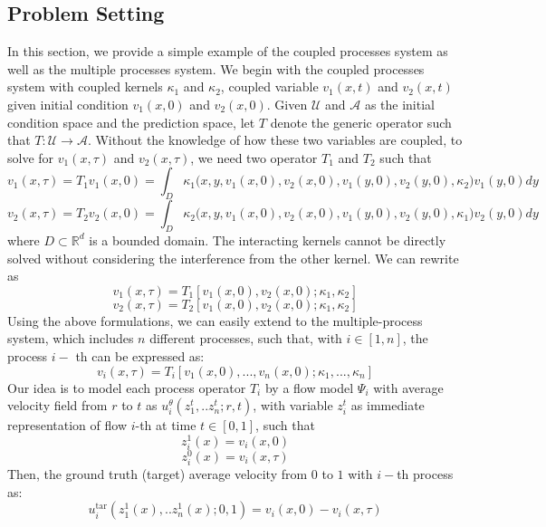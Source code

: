 \documentclass{article}
\begin{document}
\subsection{Problem Setting}
In this section, we provide a simple example of the coupled processes system as well as the multiple processes system. We begin with the coupled processes system with coupled kernels $\kappa_1$ and $\kappa_2$, coupled variable $v_1(x, t)$ and $v_2(x, t)$ given initial condition $v_1(x, 0)$ and $v_2(x, 0)$. Given $\mathcal{U}$ and $\mathcal{A}$ as the initial condition space and the prediction space, let $T$ denote the generic operator such that $T: \mathcal{U} \to \mathcal{A}$. Without the knowledge of how these two variables are coupled, to solve for $v_1(x, \tau)$ and $v_2(x, \tau)$, we need two operator $T_1$ and $T_2$ such that 
\begin{equation}
    v_1(x, \tau) = T_1 v_1(x, 0) = \int_{D} \kappa_1\big(x,y, v_1(x,0), v_2(x,0), v_1(y,0), v_2(y,0), \kappa_2\big) v_1(y,0) dy
\end{equation}
\begin{equation}
    v_2(x, \tau) = T_2 v_2(x, 0) = \int_{D} \kappa_2\big(x,y, v_1(x,0), v_2(x,0), v_1(y,0), v_2(y,0), \kappa_1\big) v_2(y,0) dy
\end{equation}
where $D \subset \mathbb{R}^{d}$ is a bounded domain. The interacting kernels cannot be directly solved without considering the interference from the other kernel. We can rewrite as 
\begin{equation}
    v_1(x, \tau) = T_1 [v_1(x, 0), v_2(x, 0); \kappa_1, \kappa_2] 
\end{equation}
\begin{equation}
    v_2(x, \tau) = T_2 [v_1(x, 0), v_2(x, 0); \kappa_1, \kappa_2] 
\end{equation}
Using the above formulations, we can easily extend to the multiple-process system, which includes $n$ different processes, such that, with $i \in [1, n]$, the process $i-$ th can be expressed as: 
\begin{equation}
    v_i(x, \tau) = T_i[v_1(x, 0), ...,v_n(x, 0); \kappa_1,..., \kappa_n]
\end{equation}
Our idea is to model each process operator $T_i$ by a flow model $\Psi_i$ with average velocity field from $r$ to $t$ as $u^{\theta}_i(z^t_1,..z^t_n; r,t )$, with variable $z^t_i$ as immediate representation of flow $i$-th at time $t \in[0,1]$, such that 
\begin{equation}
    z^1_i(x) = v_i(x, 0)
\end{equation}
\begin{equation}
    z^0_i(x) = v_i(x, \tau) 
\end{equation}
Then, the ground truth (target) average velocity from $0$ to $1$ with $i-$th process as: 
\begin{equation}
    u_i^{\text{tar}}(z^1_1(x),..z^1_n(x); 0,1 ) = v_i(x, 0) -  v_i(x, \tau) \label{eq:global_tar_velocity}
\end{equation}
\end{document}
